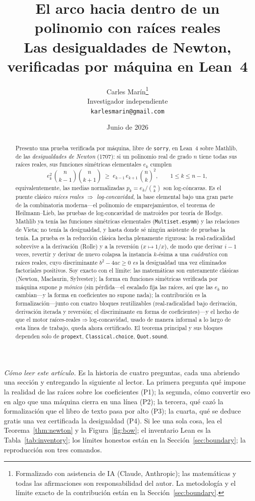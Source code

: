\documentclass[11pt]{article}
\title{\bf El arco hacia dentro de un polinomio con ra\'ices reales\\[4pt]
  \large\normalfont Las desigualdades de Newton, verificadas por m\'aquina en Lean~4}
\author{Carles Mar\'in\thanks{Formalizado con asistencia de IA (Claude, Anthropic); las
matem\'aticas y todas las afirmaciones son responsabilidad del autor. La metodolog\'ia y el
l\'imite exacto de la contribuci\'on est\'an en la Secci\'on~\ref{sec:boundary}.}\\[3pt]
  \normalsize Investigador independiente\\
  \normalsize \texttt{karlesmarin@gmail.com}}
\date{Junio de 2026}
\newcommand{\lean}[1]{\texttt{#1}}
\begin{document}
\maketitle

\begin{abstract}
Presento una prueba verificada por m\'aquina, libre de \lean{sorry}, en Lean~4 sobre Mathlib, de
las \emph{desigualdades de Newton} (1707): si un polinomio real de grado $n$ tiene todas sus
ra\'ices reales, sus funciones sim\'etricas elementales $e_k$ cumplen
\[
  e_k^2\,\binom{n}{k-1}\binom{n}{k+1}\;\ge\;e_{k-1}\,e_{k+1}\,\binom{n}{k}^{2},
  \qquad 1\le k\le n-1,
\]
equivalentemente, las medias normalizadas $p_k=e_k/\binom{n}{k}$ son log-c\'oncavas. Es el puente
cl\'asico \emph{ra\'ices reales $\Rightarrow$ log-concavidad}, la base elemental bajo una gran parte
de la combinatoria moderna---el polinomio de emparejamientos, el teorema de Heilmann--Lieb, las
pruebas de log-concavidad de matroides por teor\'ia de Hodge. Mathlib ya ten\'ia las funciones
sim\'etricas elementales (\lean{Multiset.esymm}) y las relaciones de Vieta; no ten\'ia la
desigualdad, y hasta donde s\'e ning\'un asistente de pruebas la ten\'ia. La prueba es la
reducci\'on cl\'asica hecha plenamente rigurosa: la real-radicalidad sobrevive a la derivaci\'on
(Rolle) y a la reversi\'on ($x\mapsto1/x$), de modo que derivar $i-1$ veces, revertir y derivar de
nuevo colapsa la instancia $k$-\'esima a una \emph{cu\'adratica} con ra\'ices reales, cuyo
discriminante $b^2-4ac\ge0$ \emph{es} la desigualdad una vez eliminados factoriales positivos. Soy
exacto con el l\'imite: las matem\'aticas son enteramente cl\'asicas (Newton, Maclaurin,
Sylvester); la forma en funciones sim\'etricas verificada por m\'aquina supone $p$ \emph{m\'onico}
(sin p\'erdida---el escalado fija las ra\'ices, as\'i que las $e_k$ no cambian---y la forma en
coeficientes no supone nada); la contribuci\'on es la formalizaci\'on---junto con cuatro bloques reutilizables
(real-radicalidad bajo derivaci\'on, derivaci\'on iterada y reversi\'on; el discriminante en forma
de coeficientes)---y el hecho de que el motor ra\'ices-reales$\Rightarrow$log-concavidad, usado de
manera informal a lo largo de esta l\'inea de trabajo, queda ahora certificado. El teorema principal
y sus bloques dependen solo de \lean{propext}, \lean{Classical.choice}, \lean{Quot.sound}.
\end{abstract}

\medskip
\noindent\emph{C\'omo leer este art\'iculo.} Es la historia de cuatro preguntas, cada una abriendo
una secci\'on y entregando la siguiente al lector. La primera pregunta qu\'e impone la realidad de
las ra\'ices sobre los coeficientes (P1); la segunda, c\'omo convertir eso en algo que una
m\'aquina cierra en una l\'inea (P2); la tercera, qu\'e cazó la formalizaci\'on que el libro de
texto pasa por alto (P3); la cuarta, qu\'e se deduce gratis una vez certificada la desigualdad
(P4). Si lee una sola cosa, lea el Teorema~\ref{thm:newton} y la Figura~\ref{fig:bow}; el inventario
Lean es la Tabla~\ref{tab:inventory}; los l\'imites honestos est\'an en la
Secci\'on~\ref{sec:boundary}; la reproducci\'on son tres comandos.
\end{document}
